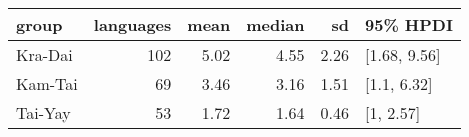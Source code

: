 
\begin{tabular}[t]{lrrrrl}
\toprule
group & languages & mean & median & sd & 95\% HPDI\\
\midrule
Kra-Dai & 102 & 5.02 & 4.55 & 2.26 & {}[1.68, 9.56]\\
Kam-Tai & 69 & 3.46 & 3.16 & 1.51 & {}[1.1, 6.32]\\
Tai-Yay & 53 & 1.72 & 1.64 & 0.46 & {}[1, 2.57]\\
\bottomrule
\end{tabular}
